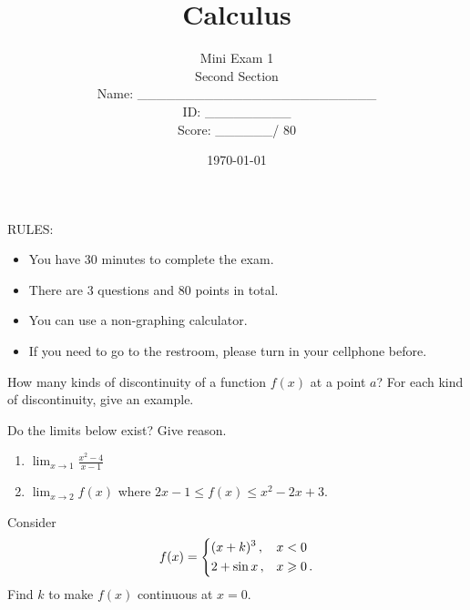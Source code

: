 \documentclass[12pt]{amsart}
\title{ Calculus }
\author{  Mini Exam 1 \\ Second Section \\ \vspace{1cm} Name: \_\_\_\_\_\_\_\_\_\_\_\_\_\_\_\_\_\_\_\_\_\_\_\_\_  
\\ \vspace{1cm} ID: \_\_\_\_\_\_\_\_\_ \\ \vspace{1cm} Score: \_\_\_\_\_\_/ 80}
\date{\today}
\begin{document}
\maketitle


RULES:
\begin{itemize}
	\item You have 30 minutes to complete the exam.
	\item There are 3 questions and 80 points in total.
	\item You can use a non-graphing calculator.
	\item If you need to go to the restroom, please turn in your cellphone before.
\end{itemize}

\pagebreak

\begin{problem}[30 points]
How many kinds of discontinuity of a function $f(x)$ at a point $a$?
For each kind of discontinuity, give an example.
\end{problem}
\newpage

\begin{problem}[30 points]
Do the limits below exist? Give reason.
\begin{enumerate}
	\item $\displaystyle \lim_{x \to 1} \frac{x^2 -4}{x-1} $
	      \vspace{8cm}
	\item  $\displaystyle \lim_{x \to 2} f(x)$
	      where $2x -1 \leq f(x) \leq x^2 -2x + 3$.
\end{enumerate}
\end{problem}

\newpage
\begin{problem}[20 points] Consider
\begin{equation*}
	f(x) = \begin{dcases}
		(x + k)^3 \,,  & x<0         \\
		2 + \sin x \,, & x\geq 0 \,.
	\end{dcases}
\end{equation*}
Find $k$ to make $f(x)$ continuous at $x = 0$.

\end{problem}


\printbibliography
%
%
\end{document}
